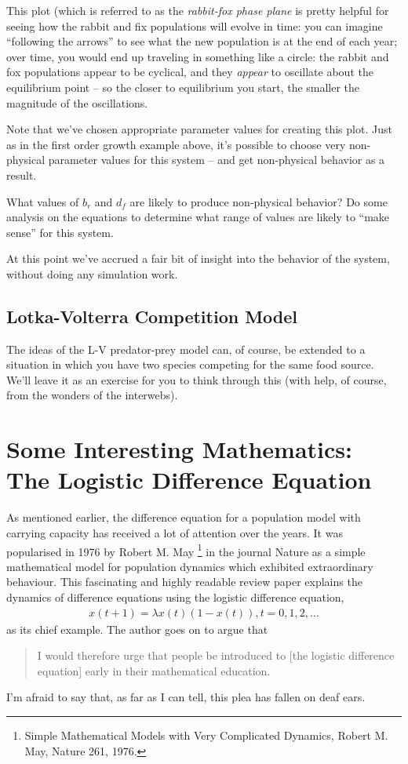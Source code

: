 This plot (which is referred to as the {\it rabbit-fox phase plane} is pretty helpful for seeing how the rabbit and fix populations will evolve in time:  you can imagine ``following the arrows'' to see what the new population is at the end of each year; over time, you would end up traveling in something like a circle:  the rabbit and fox populations appear to be cyclical, and they {\it appear} to oscillate about the equilibrium point -- so the closer to equilibrium you start, the smaller the magnitude of the oscillations.

Note that we've chosen appropriate parameter values for creating this plot.  Just as in the first order growth example above, it's possible to choose very non-physical parameter values for this system -- and get non-physical behavior as a result.


\begin{del}
What values of $b_r$ and $d_f$ are likely to produce non-physical behavior?  Do some analysis on the equations to determine what range of values are likely to ``make sense'' for this system.
\end{del}

At this point we've accrued a fair bit of insight into the behavior of the system, without doing any simulation work.  

\subsection*{Lotka-Volterra Competition Model}

The ideas of the L-V predator-prey model can, of course, be extended to a situation in which you have two species competing for the same food source.  We'll leave it as an exercise for you to think through this (with help, of course, from the wonders of the interwebs).


\section*{Some Interesting Mathematics: The Logistic Difference Equation}

As mentioned earlier, the difference equation for a population model with carrying capacity has received a lot of attention over the years. It was popularised in 1976 by Robert M. May \footnote{Simple Mathematical Models with Very Complicated Dynamics, Robert M. May, Nature 261, 1976.} in the journal Nature as a simple mathematical model for population dynamics which exhibited extraordinary behaviour. This fascinating and highly readable review paper explains the dynamics of difference equations using the logistic difference equation,
\begin{eqnarray}
x(t+1) = \lambda x(t) (1 - x(t)), t = 0, 1, 2, \ldots
\end{eqnarray}
as its chief example. The author goes on to argue that
\begin{quote}
I would therefore urge that people be introduced to [the logistic difference equation] early in their mathematical education.
\end{quote}
I'm afraid to say that, as far as I can tell, this plea has fallen on deaf ears.

